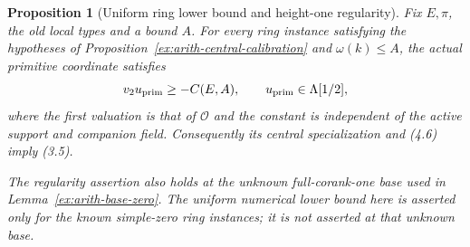 \documentclass[11pt]{article}
\newtheorem{proposition}[theorem]{Proposition}
\theoremstyle{definition}
\theoremstyle{remark}
\providecommand{\mathscr}[1]{\mathcal{#1}}
\begin{document}
\begin{proposition}[Uniform ring lower bound and height-one regularity]\label{ex:limits-uniform-lower-bound}
Fix $E,\pi$, the old local types and a bound $A$.
For every ring instance satisfying the hypotheses of
Proposition~\ref{ex:arith-central-calibration} and
$\omega(k)\leq A$, the actual primitive coordinate satisfies
\[
 v_2u_{\rm prim}\geq-C(E,A),\qquad
 u_{\rm prim}\in\Lambda[1/2],
\]
where the first valuation is that of $\mathscr O$ and the
constant is independent of the active support and companion field.
Consequently its central specialization and (4.6) imply (3.5).

The regularity assertion also holds at the unknown full-corank-one
base used in Lemma~\ref{ex:arith-base-zero}. The uniform numerical
lower bound here is asserted only for the known simple-zero ring
instances; it is not asserted at that unknown base.
\end{proposition}
\end{document}
